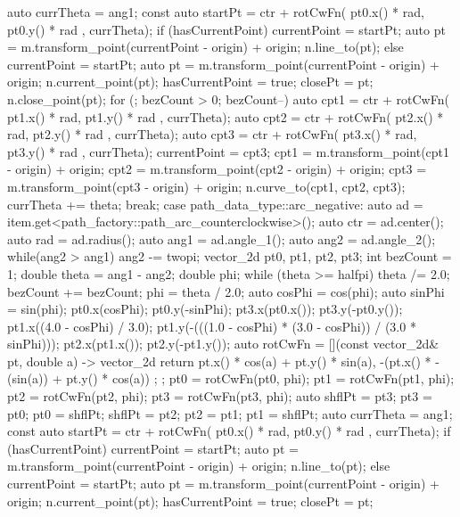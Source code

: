 \begin{codeblock}
{{{				auto currTheta = ang1;
				const auto startPt =
				ctr + rotCwFn({ pt0.x() * rad, pt0.y() * rad }, currTheta);
				if (hasCurrentPoint) {
					currentPoint = startPt;
					auto pt = m.transform_point(currentPoint - origin) + origin;
					n.line_to(pt);
				}
				else {
					currentPoint = startPt;
					auto pt = m.transform_point(currentPoint - origin) + origin;
					n.current_point(pt);
					hasCurrentPoint = true;
					closePt = pt;
					n.close_point(pt);
				}
				for (; bezCount > 0; bezCount--) {
					auto cpt1 = ctr + rotCwFn({ pt1.x() * rad, pt1.y() * rad }, currTheta);
					auto cpt2 = ctr + rotCwFn({ pt2.x() * rad, pt2.y() * rad }, currTheta);
					auto cpt3 = ctr + rotCwFn({ pt3.x() * rad, pt3.y() * rad }, currTheta);
					currentPoint = cpt3;
					cpt1 = m.transform_point(cpt1 - origin) + origin;
					cpt2 = m.transform_point(cpt2 - origin) + origin;
					cpt3 = m.transform_point(cpt3 - origin) + origin;
					n.curve_to(cpt1, cpt2, cpt3);
					currTheta += theta;
				}
			} break;
			case path_data_type::arc_negative:
			{
				auto ad = item.get<path_factory::path_arc_counterclockwise>();
				auto ctr = ad.center();
				auto rad = ad.radius();
				auto ang1 = ad.angle_1();
				auto ang2 = ad.angle_2();
				while(ang2 > ang1) {
					ang2 -= twopi;
				}
				vector_2d pt0, pt1, pt2, pt3;
				int bezCount = 1;
				double theta = ang1 - ang2;
				double phi;
				while (theta >= halfpi) {
					theta /= 2.0;
					bezCount += bezCount;
				}
				phi = theta / 2.0;
				auto cosPhi = cos(phi);
				auto sinPhi = sin(phi);
				pt0.x(cosPhi);
				pt0.y(-sinPhi);
				pt3.x(pt0.x());
				pt3.y(-pt0.y());
				pt1.x((4.0 - cosPhi) / 3.0);
				pt1.y(-(((1.0 - cosPhi) * (3.0 - cosPhi)) / (3.0 * sinPhi)));
				pt2.x(pt1.x());
				pt2.y(-pt1.y());
				auto rotCwFn = [](const vector_2d& pt, double a) -> vector_2d {
					return { pt.x() * cos(a) + pt.y() * sin(a),
						-(pt.x() * -(sin(a)) + pt.y() * cos(a)) };
				};
				pt0 = rotCwFn(pt0, phi);
				pt1 = rotCwFn(pt1, phi);
				pt2 = rotCwFn(pt2, phi);
				pt3 = rotCwFn(pt3, phi);
				auto shflPt = pt3;
				pt3 = pt0;
				pt0 = shflPt;
				shflPt = pt2;
				pt2 = pt1;
				pt1 = shflPt;
				auto currTheta = ang1;
				const auto startPt =
				ctr + rotCwFn({ pt0.x() * rad, pt0.y() * rad }, currTheta);
				if (hasCurrentPoint) {
					currentPoint = startPt;
					auto pt = m.transform_point(currentPoint - origin) + origin;
					n.line_to(pt);
				}
				else {
					currentPoint = startPt;
					auto pt = m.transform_point(currentPoint - origin) + origin;
					n.current_point(pt);
					hasCurrentPoint = true;
					closePt = pt;
}}}}
\end{codeblock}

